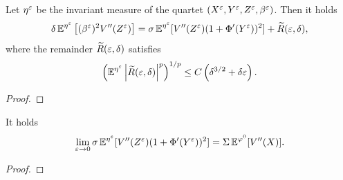 \documentclass[10pt]{article}
\begin{document}
\begin{appendices}
\begin{lemma} \label{lem:quartet}
	Let $\eta^\varepsilon$ be the invariant measure of the quartet $(X^\varepsilon, Y^\varepsilon, Z^\varepsilon, \beta^\varepsilon)$. Then it holds
	\begin{equation}
	\delta \operatorname{\mathbb{E}}^{\eta^\varepsilon} \left[ (\beta^\varepsilon)^2 V''(Z^\varepsilon) \right] = \sigma \operatorname{\mathbb{E}}^{\eta^\varepsilon} [V''(Z^\varepsilon) (1 + \Phi'(Y^\varepsilon))^2] + \widetilde R(\varepsilon,\delta),
	\end{equation}
	where the remainder $\widetilde R(\varepsilon,\delta)$ satisfies
	\begin{equation} \label{eq:quartet_remainder}
	\left( \operatorname{\mathbb{E}}^{\eta^\varepsilon} \left| \widetilde R(\varepsilon,\delta) \right|^p \right)^{1/p} \le C \left( \delta^{3/2} + \delta \varepsilon \right).
	\end{equation}
\end{lemma}
\begin{proof}
	
\end{proof}

\begin{lemma} \label{lem:quartet_convergence}
	It holds
	\begin{equation}
	\lim_{\varepsilon \to 0} \sigma \operatorname{\mathbb{E}}^{\eta^\varepsilon} [V''(Z^\varepsilon) (1 + \Phi'(Y^\varepsilon))^2] = \Sigma \operatorname{\mathbb{E}}^{\varphi^0} [V''(X)].
	\end{equation}
\end{lemma}
\begin{proof}
	
\end{proof}



\end{appendices}
\end{document}
